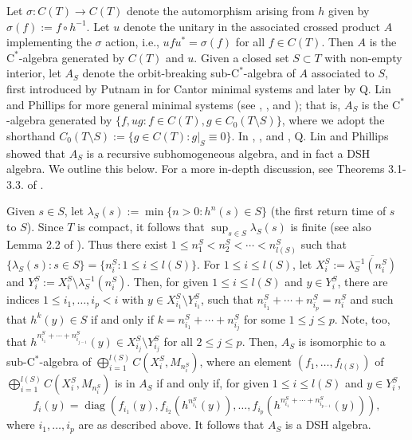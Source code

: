 \documentclass[12pt]{amsart}
\numberwithin{equation}{section}
\theoremstyle{definition}
\theoremstyle{remark}
\newcommand{\diag}{\operatorname{diag}}
\begin{document}
Let $\sigma\colon C(T)\to C(T)$ denote the automorphism arising from $h$ given by $\sigma(f):=f\circ h^{-1}$. Let $u$ denote the unitary in the associated crossed product $A$ implementing the $\sigma$ action, i.e., $ufu^{*}=\sigma(f)$ for all $f\in C(T)$. Then $A$ is the $\mathrm{C}^{*}$-algebra generated by $C(T)$ and $u$. Given a closed set $S\subset T$ with non-empty interior, let $A_{S}$ denote the orbit-breaking sub-$\mathrm{C}^{*}$-algebra of $A$ associated to $S$, first introduced by Putnam in \cite{Put}  for Cantor minimal systems and later by Q. Lin and Phillips for more general minimal systems (see \cite{Lin}, \cite{LP}, and \cite{LP2}); that is, $A_{S}$ is the $\mathrm{C}^{*}$-algebra generated by $\{f,ug:f\in C(T), g\in C_{0}(T\setminus S)\}$, where we adopt the shorthand $C_{0}(T\setminus S):=\{g\in C(T): g|_{S}\equiv 0\}$. In \cite{Lin}, \cite{LP}, and \cite{LP2}, Q. Lin and Phillips showed that $A_{S}$ is a recursive subhomogeneous algebra, and in fact a DSH algebra. We outline this below. For a more in-depth discussion, see Theorems 3.1-3.3. of \cite{LP}.

Given $s\in S$, let $\lambda_{S}(s):=\min\{n>0:h^{n}(s)\in S\}$ (the first return time of $s$ to $S$). Since $T$ is compact, it follows that $\sup_{s\in S}\lambda_{S}(s)$ is finite (see also Lemma 2.2 of \cite{LP2}). Thus there exist $1\leq n_{1}^{S}<n_{2}^{S}<\cdots<n_{ l (S)}^{S}$ such that $\{\lambda_{S}(s):s\in S\}=\{n_{i}^{S}:1\leq i\leq  l (S)\}$. For $1\leq i\leq  l (S)$, let $X_{i}^{S}:=\overline{\lambda_{S}^{-1}(n_{i}^{S})}$ and $Y_{i}^{S}:=X_{i}^{S}\setminus\lambda_{S}^{-1}(n_{i}^{S})$. Then, for given $1\leq i \leq  l (S)$ and $y\in Y_{i}^{S}$, there are indices $1\leq i_{1},\ldots,i_{p}< i$ with $y\in X_{i_{1}}^{S}\setminus Y_{i_{1}}^{S}$, such that $n_{i_{1}}^{S}+\cdots+n_{i_{p}}^{S}=n_{i}^{S}$ and such that $h^{k}(y)\in S$ if and only if $k=n_{i_{1}}^{S}+\cdots +n_{i_{j}}^{S}$ for some $1\leq j\leq p$. Note, too, that $h^{n_{i_{1}}^{S}+\cdots +n_{i_{j-1}}^{S}}(y)\in X_{i_{j}}^{S}\setminus Y_{i_{j}}^{S}$ for all $2\leq j\leq p$. Then, $A_{S}$ is isomorphic to a sub-$\mathrm{C}^*$-algebra of $\bigoplus_{i=1}^{ l (S)}C(X_{i}^{S},M_{n_{i}^{S}})$, where an element $(f_{1},\ldots,f_{ l (S)})$ of $\bigoplus_{i=1}^{ l (S)}C(X_{i}^{S},M_{n_{i}^{S}})$ is in $A_{S}$ if and only if, for given $1\leq i\leq  l (S)$ and $y\in Y_{i}^{S}$,
$$
f_{i}(y)=\diag\left(f_{i_{1}}(y),f_{i_{2}}(h^{n_{i_{1}}^{S}}(y)),\ldots,f_{i_{p}}(h^{n_{i_{1}}^{S}+\cdots +n_{i_{p-1}}^{S}}(y))\right),
$$
where $i_{1},\ldots,i_{p}$ are as described above. It follows that $A_{S}$ is a DSH algebra. 
\end{document}
